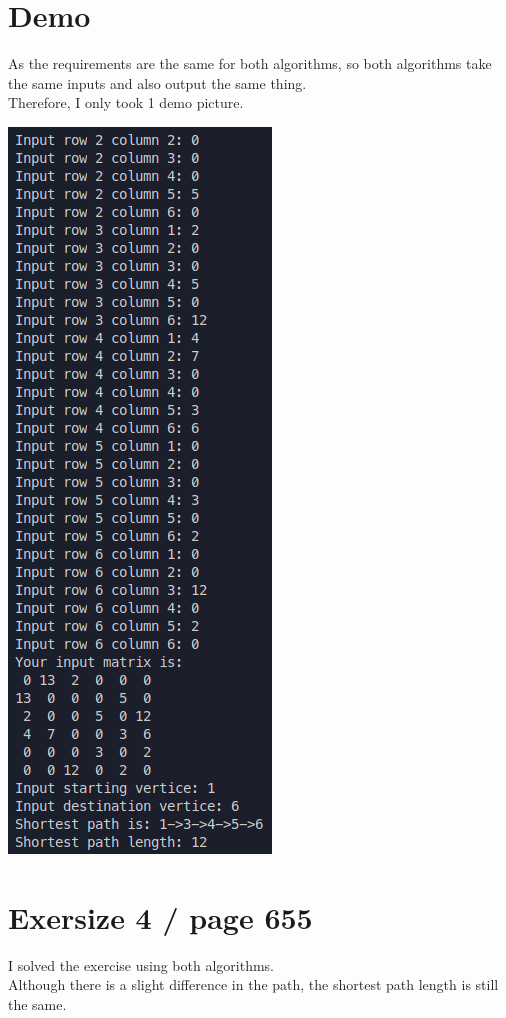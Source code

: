 \documentclass[12pt]{article}
\begin{document}
    \section*{Demo}
    As the requirements are the same for both algorithms, so both algorithms take the same inputs and also output the same thing. \\ 
    Therefore, I only took 1 demo picture.
      \begin{center}
        \includegraphics{../DijkstraDemo.png}
      \end{center}
    \section*{Exersize 4 / page 655}
      I solved the exercise using both algorithms.\\
      Although there is a slight difference in the path, the shortest path length is still the same.
\end{document}
